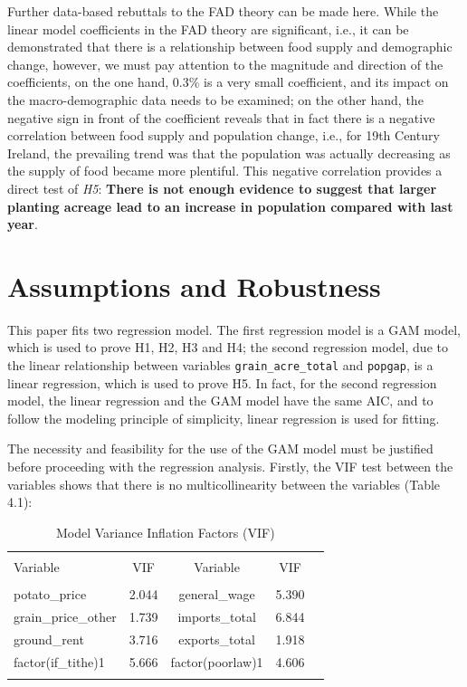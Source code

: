 Further data-based rebuttals to the FAD theory can be made here. While the linear model coefficients in the FAD theory are significant, i.e., it can be demonstrated that there is a relationship between food supply and demographic change, however, we must pay attention to the magnitude and direction of the coefficients, on the one hand, 0.3\% is a very small coefficient, and its impact on the macro-demographic data needs to be examined; on the other hand, the negative sign in front of the coefficient reveals that in fact there is a negative correlation between food supply and population change, i.e., for 19th Century Ireland, the prevailing trend was that the population was actually decreasing as the supply of food became more plentiful. This negative correlation provides a direct test of \textit{H5}: \textbf{There is not enough evidence to suggest that larger planting acreage lead to an increase in population compared with last year}.

\section{Assumptions and Robustness}

This paper fits two regression model. The first regression model is a GAM model, which is used to prove H1, H2, H3 and H4; the second regression model, due to the linear relationship between variables \texttt{grain\_acre\_total} and \texttt{popgap}, is a linear regression, which is used to prove H5. In fact, for the second regression model, the linear regression and the GAM model have the same AIC, and to follow the modeling principle of simplicity, linear regression is used for fitting.

The necessity and feasibility for the use of the GAM model must be justified before proceeding with the regression analysis. Firstly, the VIF test between the variables shows that there is no multicollinearity between the variables (Table 4.1):

\begin{table}[h] \centering 
    \caption{Model Variance Inflation Factors (VIF)} 
    \label{vif_table} 
    \begin{tabular}{lcccc} 
    \\[-1.8ex]\hline 
    \hline \\[-1.8ex] 
    Variable & VIF & Variable & VIF \\ 
    \hline \\[-1.8ex] 
    potato\_price & 2.044 & general\_wage & 5.390 \\ 
    grain\_price\_other & 1.739 & imports\_total & 6.844 \\ 
    ground\_rent & 3.716 & exports\_total & 1.918 \\ 
    factor(if\_tithe)1 & 5.666 & factor(poorlaw)1 & 4.606 \\ 
    \hline 
    \hline \\[-1.8ex] 
    \end{tabular} 
  \end{table}


